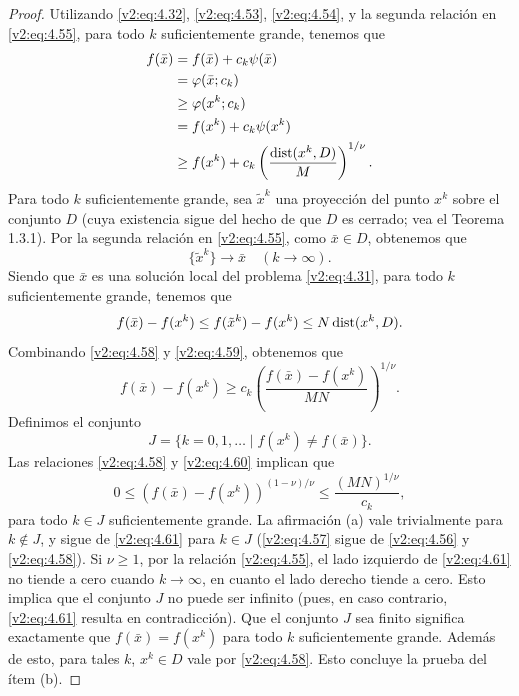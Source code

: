 \begin{proof}
    Utilizando \eqref{v2:eq:4.32}, \eqref{v2:eq:4.53}, \eqref{v2:eq:4.54}, y la segunda relación en \eqref{v2:eq:4.55}, para todo $k$ suficientemente grande, tenemos que
    \begin{align}
        f(\bar{x}) &= f(\bar{x}) + c_k\psi(\bar{x}) \nonumber \\
        &= \varphi(\bar{x}; c_k) \nonumber \\
        &\ge \varphi(x^k; c_k) \nonumber \\
        &= f(x^k) + c_k\psi(x^k) \nonumber \\
        &\ge f(x^k) + c_k \left( \frac{\operatorname{dist}(x^k, D)}{M} \right)^{1/\nu}.
        \label{v2:eq:4.58}
    \end{align}
    Para todo $k$ suficientemente grande, sea $\tilde{x}^k$ una proyección del punto $x^k$ sobre el conjunto $D$ (cuya existencia sigue del hecho de que $D$ es cerrado; vea el Teorema 1.3.1). Por la segunda relación en \eqref{v2:eq:4.55}, como $\bar{x} \in D$, obtenemos que
    \[
        \{\tilde{x}^k\} \to \bar{x} \quad (k \to \infty).
    \]
    Siendo que $\bar{x}$ es una solución local del problema \eqref{v2:eq:4.31}, para todo $k$ suficientemente grande, tenemos que
    \begin{equation}
        f(\bar{x}) - f(x^k) \le f(\tilde{x}^k) - f(x^k) \le N\operatorname{dist}(x^k, D).
        \label{v2:eq:4.59}
    \end{equation}
    Combinando \eqref{v2:eq:4.58} y \eqref{v2:eq:4.59}, obtenemos que
    \begin{equation}
        f(\bar{x}) - f(x^k) \ge c_k \left( \frac{f(\bar{x}) - f(x^k)}{MN} \right)^{1/\nu}.
        \label{v2:eq:4.60}
    \end{equation}
    Definimos el conjunto
    \[
        J = \{k = 0, 1, \dots \mid f(x^k) \neq f(\bar{x})\}.
    \]
    Las relaciones \eqref{v2:eq:4.58} y \eqref{v2:eq:4.60} implican que
    \begin{equation}
        0 \le (f(\bar{x}) - f(x^k))^{(1-\nu)/\nu} \le \frac{(MN)^{1/\nu}}{c_k},
        \label{v2:eq:4.61}
    \end{equation}
    para todo $k \in J$ suficientemente grande.
    La afirmación (a) vale trivialmente para $k \notin J$, y sigue de \eqref{v2:eq:4.61} para $k \in J$ (\eqref{v2:eq:4.57} sigue de \eqref{v2:eq:4.56} y \eqref{v2:eq:4.58}).
    Si $\nu \ge 1$, por la relación \eqref{v2:eq:4.55}, el lado izquierdo de \eqref{v2:eq:4.61} no tiende a cero cuando $k \to \infty$, en cuanto el lado derecho tiende a cero. Esto implica que el conjunto $J$ no puede ser infinito (pues, en caso contrario, \eqref{v2:eq:4.61} resulta en contradicción). Que el conjunto $J$ sea finito significa exactamente que $f(\bar{x}) = f(x^k)$ para todo $k$ suficientemente grande. Además de esto, para tales $k$, $x^k \in D$ vale por \eqref{v2:eq:4.58}. Esto concluye la prueba del ítem (b).
\end{proof}

